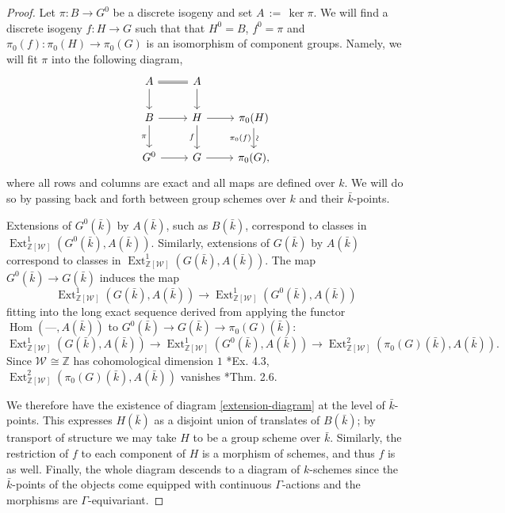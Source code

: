 \documentclass{amsart}
\theoremstyle{plain}
\theoremstyle{definition}
\theoremstyle{remark}
\newcommand{\ZZ}{{\mathbb{Z}}}
\newcommand{\bFq}{\bar{k}}
\newcommand{\Fq}{k}
\newcommand{\Weil}[1]{\mathcal{W}_{#1}}
\DeclareMathOperator{\Hom}{Hom}
\DeclareMathOperator{\Ext}{Ext}
\newcommand{\ceq}{{\, :=\, }}
\begin{document}
\begin{proof}
Let $\pi: B \to G^0$ be a discrete isogeny and set $A \ceq \ker \pi$.
  We will find a discrete isogeny $f: H\to G$
  such that that $H^0 = B$, $f^0 =\pi$ and
  $\pi_0(f) : \pi_0(H)\to \pi_0(G)$ is an isomorphism of component
  groups.  Namely, we will fit $\pi$ into the following diagram,
  \begin{equation}\label{extension-diagram}
  \begin{tikzcd}
  A \arrow[equal]{r} \dar & A \dar \\
  B \rar \dar[swap]{\pi} & H \rar \dar[swap]{f} & \pi_0(H) \arrow{d}[below,rotate=90]{\sim}[swap]{\pi_0(f)} \\
  G^0 \rar & G \rar & \pi_0(G),
  \end{tikzcd}
  \end{equation}
  where all rows and columns are exact and all maps are defined over
  $\Fq$.  We will do so by passing back and forth between group
  schemes over $\Fq$ and their $\bFq$-points.

  Extensions of $G^0(\bFq)$ by $A(\bFq)$, such as $B(\bFq)$,
  correspond to classes in $\Ext^1_{\ZZ[\Weil{}]}(G^0(\bFq), A(\bFq))$.
  Similarly, extensions of $G(\bFq)$ by $A(\bFq)$ correspond to
  classes in $\Ext^1_{\ZZ[\Weil{}]}(G(\bFq), A(\bFq))$.  The map
  $G^0(\bFq) \to G(\bFq)$ induces the map
  \[
  \Ext^1_{\ZZ[\Weil{}]}(G(\bFq), A(\bFq)) \to \Ext^1_{\ZZ[\Weil{}]}(G^0(\bFq), A(\bFq))
  \]
  fitting into the long exact sequence derived from applying
  the functor $\Hom(\mbox{---}, A(\bFq))$ to $G^0(\bFq) \to G(\bFq) \to \pi_0(G)(\bFq)$:
  \[
  \Ext^1_{\ZZ[\Weil{}]}(G(\bFq), A(\bFq)) \to \Ext^1_{\ZZ[\Weil{}]}(G^0(\bFq), A(\bFq)) \to \Ext^2_{\ZZ[\Weil{}]}(\pi_0(G)(\bFq), A(\bFq)).
  \]
  Since $\Weil{} \cong \ZZ$ has cohomological dimension $1$ \cite{brown:CohomologyGrps}*{Ex. 4.3},
  $\Ext^2_{\ZZ[\Weil{}]}(\pi_0(G)(\bFq), A(\bFq))$ vanishes \cite{cartan-eilenberg:HomologicalAlgebra}*{Thm. 2.6}.

  We therefore have the existence of diagram \eqref{extension-diagram}
  at the level of $\bFq$-points.  This expresses $H(\bFq)$ as a
  disjoint union of translates of $B(\bFq)$; by transport of structure
  we may take $H$ to be a group scheme over $\bFq$.  Similarly, the
  restriction of $f$ to each component of $H$ is a morphism of
  schemes, and thus $f$ is as well.  Finally, the whole diagram
  descends to a diagram of $\Fq$-schemes since the $\bFq$-points of
  the objects come equipped with continuous $\Gamma$-actions and the
  morphisms are $\Gamma$-equivariant.
\end{proof}
\end{document}

